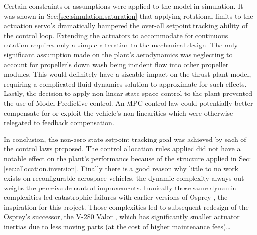 \par
Certain constraints or assumptions were applied to the model in simulation. It was shown in Sec:\ref{sec:simulation.saturation} that applying rotational limits to the actuation servo's dramatically hampered the over-all setpoint tracking ability of the control loop. Extending the actuators to accommodate for continuous rotation requires only a simple alteration to the mechanical design. The only significant assumption made on the plant's aerodynamics was neglecting to account for propeller's down wash being incident flow into other propeller modules. This would definitely have a sizeable impact on the thrust plant model, requiring a complicated fluid dynamics solution to approximate for such effects. Lastly, the decision to apply non-linear state space control to the plant prevented the use of Model Predictive control. An MPC control law could potentially better compensate for or exploit the vehicle's non-linearities which were otherwise relegated to feedback compensation.
\par
In conclusion, the non-zero state setpoint tracking goal was achieved by each of the control laws proposed. The control allocation rules applied did not have a notable effect on the plant's performance because of the structure applied in Sec:\ref{sec:allocation.inversion}. Finally there is a good reason why little to no work exists on reconfigurable aerospace vehicles, the dynamic complexity always out weighs the perceivable control improvements. Ironically those same dynamic complexities led catastrophic failures with earlier versions of Osprey \cite{ospreywired}, the inspiration for this project. Those complexities led to subsequent redesign of the Osprey's successor, the V-280 Valor \cite{}, which has significantly smaller actuator inertias due to less moving parts (at the cost of higher maintenance fees)\ldots
